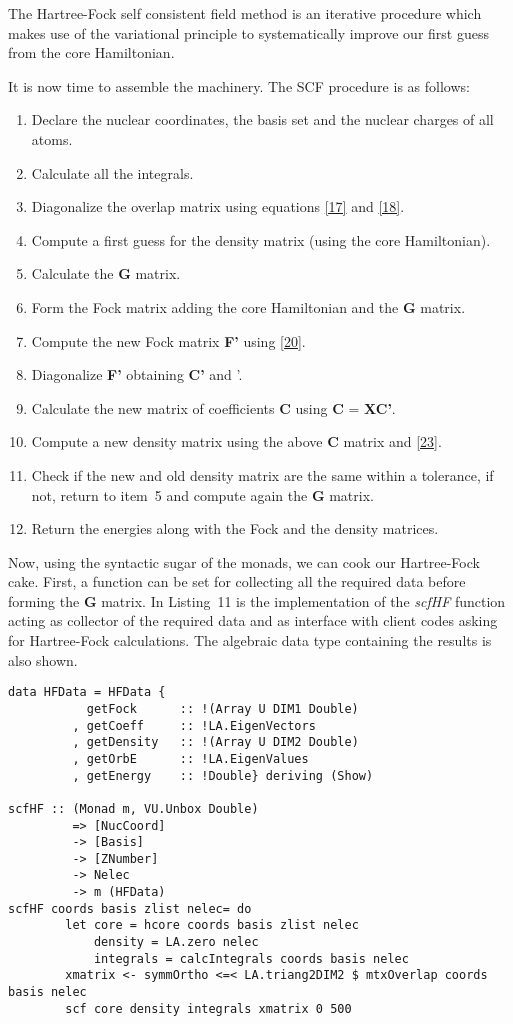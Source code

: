 \documentclass{tmr}
\begin{document}
The Hartree-Fock self consistent field method is an iterative procedure
which makes use of
the variational principle to systematically improve our first guess from
the core Hamiltonian.

It is now time to assemble the machinery. The SCF procedure is as follows:

\begin{enumerate}
\item Declare the nuclear coordinates, the basis set and the nuclear
charges of all atoms.
\item Calculate all the integrals.
\item Diagonalize the overlap matrix using equations \eqref{17} and \eqref{18}.
\item Compute a first guess for the density matrix (using the core Hamiltonian).
\item Calculate the \textbf{G} matrix.
\item Form the Fock matrix adding the core Hamiltonian and the \textbf{G} matrix.
\item Compute the new Fock matrix \textbf{F'} using \eqref{20}.
\item Diagonalize \textbf{F'} obtaining \textbf{C'} and \textepsilon'.
\item Calculate the new matrix of coefficients \textbf{C} using \textbf{C} = \textbf{XC'}.  
\item Compute a new density matrix using the above \textbf{C} matrix and \eqref{23}.
\item Check if the new and old density matrix are the same within a tolerance, if not,
      return to item~5 and compute again the \textbf{G} matrix. 
\item Return the energies along with the Fock and the density matrices.
\end{enumerate}
Now, using the syntactic sugar of the monads, we can cook our Hartree-Fock cake. First,
a function can be set for collecting all the required data before forming the 
\textbf{G} matrix. In Listing~11 is the implementation of the \textit{scfHF} function acting
as collector of the required data and as interface with client codes asking
for Hartree-Fock calculations. The algebraic data type containing the results
is also shown.

\begin{lstlisting}[float,captionpos=b,belowcaptionskip=4pt, caption= The Interface function]
data HFData = HFData {
           getFock      :: !(Array U DIM1 Double)
         , getCoeff     :: !LA.EigenVectors 
         , getDensity   :: !(Array U DIM2 Double)
         , getOrbE      :: !LA.EigenValues
         , getEnergy    :: !Double} deriving (Show)

scfHF :: (Monad m, VU.Unbox Double)
         => [NucCoord] 
         -> [Basis]
         -> [ZNumber]
         -> Nelec
         -> m (HFData)
scfHF coords basis zlist nelec= do 
        let core = hcore coords basis zlist nelec
            density = LA.zero nelec
            integrals = calcIntegrals coords basis nelec           
        xmatrix <- symmOrtho <=< LA.triang2DIM2 $ mtxOverlap coords basis nelec
        scf core density integrals xmatrix 0 500

\end{lstlisting}
\end{document}
